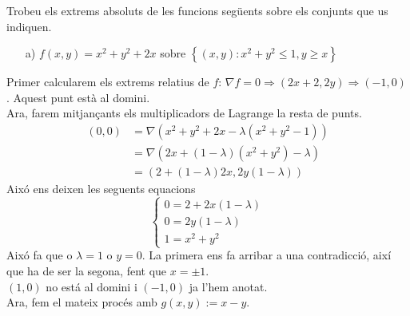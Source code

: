 \documentclass[a4paper, 12pt]{article}
\begin{document}
    \setcounter{numex}{61}
    \begin{exercici}
        Trobeu els extrems absoluts de les funcions següents sobre els conjunts que us indiquen.
        \begin{itemize}
            \item[a)] $f\left(x,y\right) = x^2+y^2+2x$ sobre $\left\{\left(x,y\right): x^2+y^2\leq 1, y\geq x\right\}$
        \end{itemize}
    \end{exercici}
    \begin{solucio}
        Primer calcularem els extrems relatius de $f$:
        $\nabla f = 0 \Rightarrow \left(2x+2, 2y\right) \Rightarrow \left(-1, 0\right)$. Aquest punt
        està al domini.\\
        Ara, farem mitjançants els multiplicadors de Lagrange la resta de punts.\\
        \begin{displaymath}
            \begin{split}
                \left(0,0\right) &= \nabla\left(x^2+y^2+2x - \lambda\left(x^2+y^2-1\right)\right)\\
                &= \nabla\left(2x +\left(1 - \lambda\right)\left(x^2+y^2\right)-\lambda\right)\\
                &= \left(2 +\left(1 - \lambda\right)2x, 2y\left(1 - \lambda\right)\right)
            \end{split}
        \end{displaymath}
        Aixó ens deixen les seguents equacions
        \begin{displaymath}
            \begin{cases}
                0 = 2+2x\left(1 - \lambda\right)\\
                0 = 2y\left(1 - \lambda\right)\\
                1 = x^2+y^2
            \end{cases}
        \end{displaymath}
        Aixó fa que o $\lambda = 1$ o $y = 0$. La primera ens fa arribar a una contradicció, així
        que ha de ser la segona, fent que $x = \pm1$.\\
        $\left(1,0\right)$ no está al domini i $\left(-1, 0\right)$ ja l'hem anotat.\\
        Ara, fem el mateix procés amb $g(x,y) := x - y$.\\
        \begin{displaymath}
            \begin{split}

\end{split}
\end{displaymath}
\end{solucio}
\end{document}
